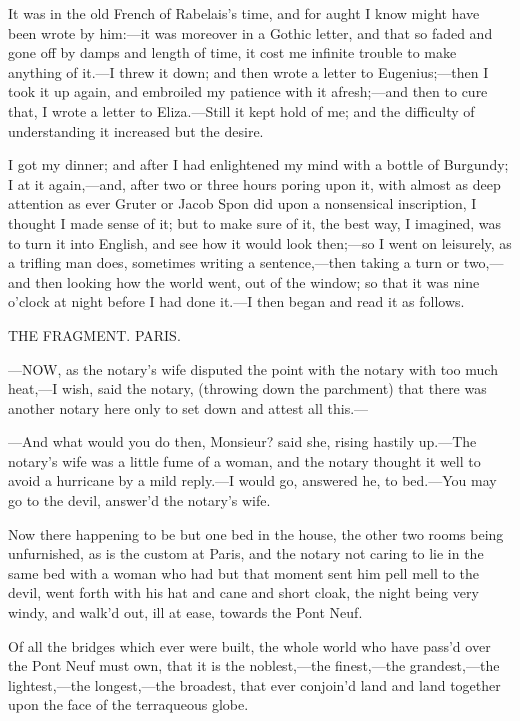 \documentclass[twoside]{article}
\begin{document}
It was in the old French of Rabelais’s time, and for aught I know might
have been wrote by him:—it was moreover in a Gothic letter, and that so
faded and gone off by damps and length of time, it cost me infinite
trouble to make anything of it.—I threw it down; and then wrote a letter
to Eugenius;—then I took it up again, and embroiled my patience with it
afresh;—and then to cure that, I wrote a letter to Eliza.—Still it kept
hold of me; and the difficulty of understanding it increased but the
desire.

I got my dinner; and after I had enlightened my mind with a bottle of
Burgundy; I at it again,—and, after two or three hours poring upon it,
with almost as deep attention as ever Gruter or Jacob Spon did upon a
nonsensical inscription, I thought I made sense of it; but to make sure
of it, the best way, I imagined, was to turn it into English, and see how
it would look then;—so I went on leisurely, as a trifling man does,
sometimes writing a sentence,—then taking a turn or two,—and then looking
how the world went, out of the window; so that it was nine o’clock at
night before I had done it.—I then began and read it as follows.




THE FRAGMENT.
PARIS.


—NOW, as the notary’s wife disputed the point with the notary with too
much heat,—I wish, said the notary, (throwing down the parchment) that
there was another notary here only to set down and attest all this.—

—And what would you do then, Monsieur? said she, rising hastily up.—The
notary’s wife was a little fume of a woman, and the notary thought it
well to avoid a hurricane by a mild reply.—I would go, answered he, to
bed.—You may go to the devil, answer’d the notary’s wife.

Now there happening to be but one bed in the house, the other two rooms
being unfurnished, as is the custom at Paris, and the notary not caring
to lie in the same bed with a woman who had but that moment sent him pell
mell to the devil, went forth with his hat and cane and short cloak, the
night being very windy, and walk’d out, ill at ease, towards the Pont
Neuf.

Of all the bridges which ever were built, the whole world who have pass’d
over the Pont Neuf must own, that it is the noblest,—the finest,—the
grandest,—the lightest,—the longest,—the broadest, that ever conjoin’d
land and land together upon the face of the terraqueous globe.
\end{document}
